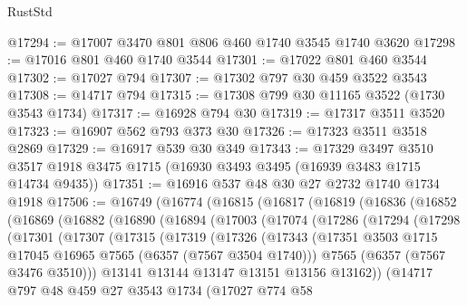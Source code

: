 \begin{lexlean}{RustStd}
\begin{coremodule}
@17294 := @17007 @3470 @801 @806 @460 @1740 @3545 @1740 @3620
@17298 := @17016 @801 @460 @1740 @3544
@17301 := @17022 @801 @460 @3544
@17302 := @17027 @794
@17307 := @17302 @797 @30 @459 @3522 @3543
@17308 := @14717 @794
@17315 := @17308 @799 @30 @11165 @3522 (@1730 @3543 @1734)
@17317 := @16928 @794 @30
@17319 := @17317 @3511 @3520
@17323 := @16907 @562 @793 @373 @30
@17326 := @17323 @3511 @3518 @2869
@17329 := @16917 @539 @30 @349
@17343 := @17329
    @3497
    @3510
    @3517
    @1918
    @3475
    @1715
    (@16930 @3493 @3495 (@16939 @3483 @1715 @14734 @9435))
@17351 := @16916 @537 @48 @30 @27 @2732 @1740 @1734 @1918
@17506 := @16749
    (@16774
      (@16815
        (@16817
          (@16819
            (@16836
              (@16852
                (@16869
                  (@16882
                    (@16890
                      (@16894
                        (@17003
                          (@17074
                            (@17286
                              (@17294
                                (@17298
                                  (@17301
                                    (@17307
                                      (@17315
                                        (@17319
                                          (@17326
                                            (@17343
                                              (@17351
                                                @3503
                                                @1715
                                                @17045
                                                @16965
                                                @7565
                                                (@6357 (@7567 @3504 @1740)))
                                              @7565
                                              (@6357 (@7567 @3476 @3510)))
                                            @13141
                                            @13144
                                            @13147
                                            @13151
                                            @13156
                                            @13162))
                                        (@14717
                                          @797
                                          @48
                                          @459
                                          @27
                                          @3543
                                          @1734
                                          (@17027
                                            @774
                                            @58

\end{coremodule}
\end{lexlean}

